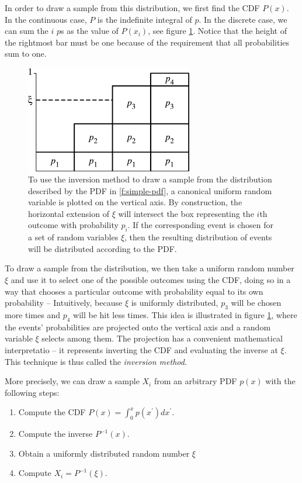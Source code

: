 In order to draw a sample from this distribution, we first find the CDF $P(x)$. In the continuous case, $P$ is the indefinite integral of $p$. In the discrete case, we can sum the $i$ $p$s as the value of $P(x_i)$, see figure \ref{f:simple-cdf}. Notice that the height of the rightmost bar must be one because of the requirement that all probabilities sum to one.

\begin{figure}
\sidecaption
	\includegraphics[width=0.65\textwidth]{graphics/gi/mc-4}
	\caption{To use the inversion method to draw a sample from the distribution described by the PDF in \ref{f:simple-pdf}, a canonical uniform random variable is plotted on the vertical axis. By construction, the horizontal extension of $\xi$ will intersect the box representing the $i$th outcome with probability $p_i$. If the corresponding event is chosen for a set of random variables $\xi$, then the resulting distribution of events will be distributed according to the PDF.}
	\label{f:simple-cdf}
\end{figure}

To draw a sample from the distribution, we then take a uniform random number $\xi$ and use it to select one of the possible outcomes using the CDF, doing so in a way that chooses a particular outcome with probability equal to its own probability -- Intuitively, because $\xi$ is uniformly distributed, $p_3$ will be chosen more times and $p_4$ will be hit less times. This idea is illustrated in figure \ref{f:simple-cdf}, where the events' probabilities are projected onto the vertical axis and a random variable $\xi$ selects among them. The projection has a convenient mathematical interpretatio -- it represents inverting the CDF and evaluating the inverse at $\xi$. This technique is thus called the \textit{inversion method}. 

More precisely, we can draw a sample $X_i$ from an arbitrary PDF $p(x)$ with the following steps:

\begin{enumerate}
	\item Compute the CDF $P(x)=\int_{0}^{x}p(x^{'})dx^{'}$.
	\item Compute the inverse $P^{-1}(x)$.
	\item Obtain a uniformly distributed random number $\xi$
	\item Compute $X_i=P^{-1}(\xi)$.
\end{enumerate}



